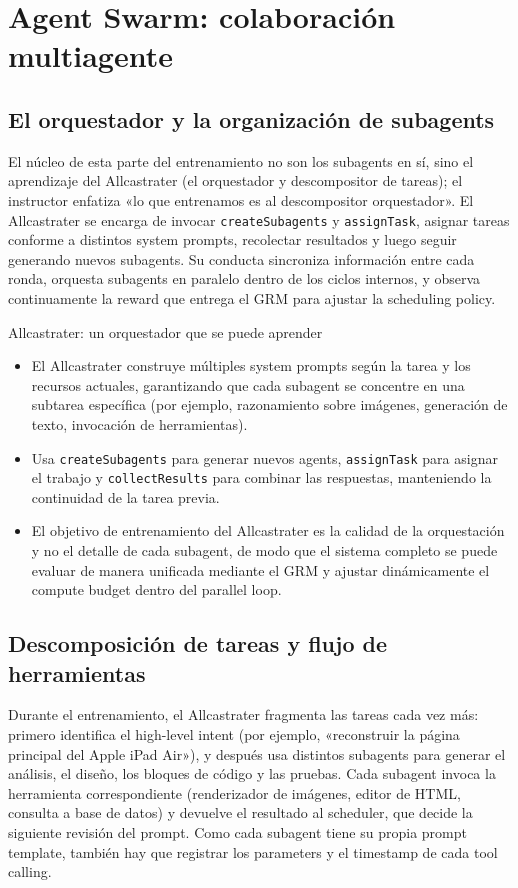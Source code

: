 \section{Agent Swarm: colaboración multiagente}

\subsection{El orquestador y la organización de subagents}
El núcleo de esta parte del entrenamiento no son los subagents en sí, sino el aprendizaje del Allcastrater (el orquestador y descompositor de tareas); el instructor enfatiza «lo que entrenamos es al descompositor orquestador». El Allcastrater se encarga de invocar \texttt{createSubagents} y \texttt{assignTask}, asignar tareas conforme a distintos system prompts, recolectar resultados y luego seguir generando nuevos subagents. Su conducta sincroniza información entre cada ronda, orquesta subagents en paralelo dentro de los ciclos internos, y observa continuamente la reward que entrega el GRM para ajustar la scheduling policy.

\begin{knowledgebox}{Allcastrater: un orquestador que se puede aprender}
\begin{itemize}
    \item El Allcastrater construye múltiples system prompts según la tarea y los recursos actuales, garantizando que cada subagent se concentre en una subtarea específica (por ejemplo, razonamiento sobre imágenes, generación de texto, invocación de herramientas).
    \item Usa \texttt{createSubagents} para generar nuevos agents, \texttt{assignTask} para asignar el trabajo y \texttt{collectResults} para combinar las respuestas, manteniendo la continuidad de la tarea previa.
    \item El objetivo de entrenamiento del Allcastrater es la calidad de la orquestación y no el detalle de cada subagent, de modo que el sistema completo se puede evaluar de manera unificada mediante el GRM y ajustar dinámicamente el compute budget dentro del parallel loop.
\end{itemize}
\end{knowledgebox}

\subsection{Descomposición de tareas y flujo de herramientas}
Durante el entrenamiento, el Allcastrater fragmenta las tareas cada vez más: primero identifica el high-level intent (por ejemplo, «reconstruir la página principal del Apple iPad Air»), y después usa distintos subagents para generar el análisis, el diseño, los bloques de código y las pruebas. Cada subagent invoca la herramienta correspondiente (renderizador de imágenes, editor de HTML, consulta a base de datos) y devuelve el resultado al scheduler, que decide la siguiente revisión del prompt. Como cada subagent tiene su propia prompt template, también hay que registrar los parameters y el timestamp de cada tool calling.

